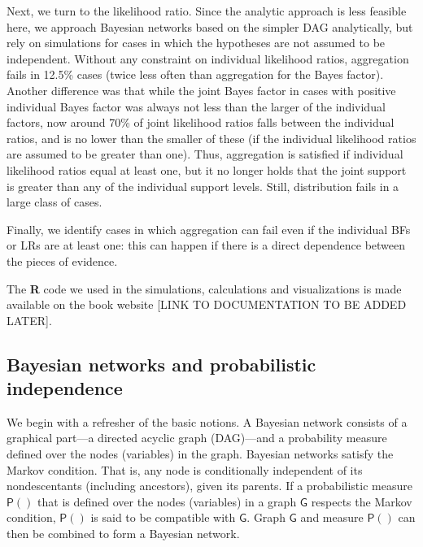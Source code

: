 \documentclass[
  10pt,
  dvipsnames,enabledeprecatedfontcommands]{scrartcl}
\newcommand{\pr}[1]{\ensuremath{\mathsf{P}(#1)}}
\begin{document}
Next, we turn to the likelihood ratio. Since the analytic approach is
less feasible here, we approach Bayesian networks based on the simpler
\textsf{DAG} analytically, but rely on simulations for cases in which
the hypotheses are not assumed to be independent. Without any constraint
on individual likelihood ratios, aggregation fails in 12.5\% cases
(twice less often than aggregation for the Bayes factor). Another
difference was that while the joint Bayes factor in cases with positive
individual Bayes factor was always not less than the larger of the
individual factors, now around 70\% of joint likelihood ratios falls
between the individual ratios, and is no lower than the smaller of these
(if the individual likelihood ratios are assumed to be greater than
one). Thus, aggregation is satisfied if individual likelihood ratios
equal at least one, but it no longer holds that the joint support is
greater than any of the individual support levels. Still, distribution
fails in a large class of cases.

Finally, we identify cases in which aggregation can fail even if the
individual BFs or LRs are at least one: this can happen if there is a
direct dependence between the pieces of evidence.

The \textsf{\textbf{R}} code we used in the simulations, calculations
and visualizations is made available on the book website {[}LINK TO
DOCUMENTATION TO BE ADDED LATER{]}.

\hypertarget{bayesian-networks-and-probabilistic-independence}{%
\subsection*{Bayesian networks and probabilistic
independence}\label{bayesian-networks-and-probabilistic-independence}}

We begin with a refresher of the basic notions. A Bayesian network
consists of a graphical part---a directed acyclic graph (DAG)---and a
probability measure defined over the nodes (variables) in the graph.
Bayesian networks satisfy the Markov condition. That is, any node is
conditionally independent of its nondescentants (including ancestors),
given its parents. If a probabilistic measure \(\pr{}\) that is defined
over the nodes (variables) in a graph \(\mathsf{G}\) respects the Markov
condition, \(\pr{}\) is said to be compatible with \(\mathsf{G}\). Graph
\(\mathsf{G}\) and measure \(\pr{}\) can then be combined to form a
Bayesian network.
\end{document}
